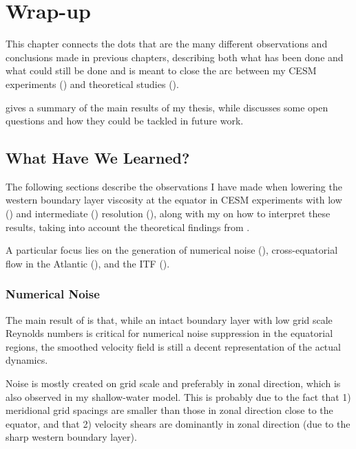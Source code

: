 \chapter{Wrap-up}
This chapter connects the dots that are the many different observations and conclusions made in previous chapters, describing both what has been done and what could still be done and is meant to close the arc between my \acs{CESM} experiments () and theoretical studies ().

 gives a summary of the main results of my thesis, while  discusses some open questions and how they could be tackled in future work.

\section{What Have We Learned?}
\label{sec:outro-summary}
The following sections describe the observations I have made when lowering the western boundary layer viscosity at the equator in \acs{CESM} experiments with low () and intermediate () resolution (), along with my  on how to interpret these results, taking into account the theoretical findings from .

A particular focus lies on the generation of numerical noise (), cross-equatorial flow in the Atlantic (), and the \ac{ITF} ().

\subsection{Numerical Noise}
\label{sec:outro-noise}
The main result of  is that, while an intact boundary layer with low grid scale Reynolds numbers is critical for numerical noise suppression in the equatorial regions, the smoothed velocity field is still a decent representation of the actual dynamics.

Noise is mostly created on grid scale and preferably in zonal direction, which is also observed in my shallow-water model. This is probably due to the fact that 1) meridional grid spacings are smaller than those in zonal direction close to the equator, and that 2) velocity shears are dominantly in zonal direction (due to the sharp western boundary layer). 

